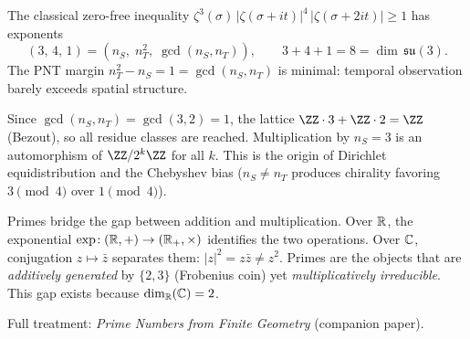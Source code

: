 \begin{theorem}
\label{thm:pnt_exponents}
The classical zero-free inequality $\zeta^3(\sigma)\,|\zeta(\sigma+it)|^4\,|\zeta(\sigma+2it)|\ge 1$ has exponents
\begin{equation}
\boxed{(3,\,4,\,1) = (n_S,\; n_T^2,\; \gcd(n_S,n_T)), \qquad 3+4+1 = 8 = \dim\,\mathfrak{su}(3).}
\end{equation}
The PNT margin $n_T^2 - n_S = 1 = \gcd(n_S,n_T)$ is minimal: temporal observation barely exceeds spatial structure.
\end{theorem}

\begin{theorem}[Equidistribution from $\gcd(2,3)=1$]
\label{thm:equidistrib}
Since $\gcd(n_S, n_T) = \gcd(3,2) = 1$, the lattice $\ZZ\cdot 3 + \ZZ\cdot 2 = \ZZ$ (Bezout), so all residue classes are reached.  Multiplication by $n_S=3$ is an automorphism of $\ZZ/2^k\ZZ$ for all $k$.  This is the origin of Dirichlet equidistribution and the Chebyshev bias ($n_S \neq n_T$ produces chirality favoring $3\!\pmod{4}$ over $1\!\pmod{4}$).
\end{theorem}

\begin{remark}
Primes bridge the gap between addition and multiplication.  Over $\mathbb{R}$, the exponential $\exp\!: (\mathbb{R},+)\to(\mathbb{R}_+,\times)$ identifies the two operations.  Over $\mathbb{C}$, conjugation $z\mapsto\bar z$ separates them: $|z|^2 = z\bar z \neq z^2$.  Primes are the objects that are \emph{additively generated} by $\{2,3\}$ (Frobenius coin) yet \emph{multiplicatively irreducible}.  This gap exists because $\dim_{\mathbb{R}}(\mathbb{C}) = 2$.
\end{remark}

\noindent Full treatment: \textit{Prime Numbers from Finite Geometry} (companion paper).
